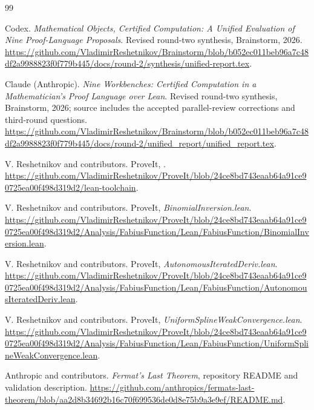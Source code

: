 \documentclass[11pt,letterpaper]{article}
\theoremstyle{definition}\newtheorem{definition}[theorem]{Definition}
\newcommand{\code}[1]{\texttt{\detokenize{#1}}}
\begin{document}
\begin{thebibliography}{99}
\small\raggedright
{}
Codex. \emph{Mathematical Objects, Certified Computation: A Unified Evaluation of Nine Proof-Language Proposals}. Revised round-two synthesis, Brainstorm, 2026.\newline
\url{https://github.com/VladimirReshetnikov/Brainstorm/blob/b052ec011beb96a7c48df2a9988823f0f779b445/docs/round-2/synthesis/unified-report.tex}.

Claude (Anthropic). \emph{Nine Workbenches: Certified Computation in a Mathematician's Proof Language over Lean}. Revised round-two synthesis, Brainstorm, 2026; source includes the accepted parallel-review corrections and third-round questions.\newline
\url{https://github.com/VladimirReshetnikov/Brainstorm/blob/b052ec011beb96a7c48df2a9988823f0f779b445/docs/round-2/unified_report/unified_report.tex}.

V. Reshetnikov and contributors. ProveIt, \code{lean-toolchain}.\newline
\url{https://github.com/VladimirReshetnikov/ProveIt/blob/24ce8bd743eaab64a91ce90725ea00f498d319d2/lean-toolchain}.

V. Reshetnikov and contributors. ProveIt, \emph{BinomialInversion.lean}.\newline
\url{https://github.com/VladimirReshetnikov/ProveIt/blob/24ce8bd743eaab64a91ce90725ea00f498d319d2/Analysis/FabiusFunction/Lean/FabiusFunction/BinomialInversion.lean}.

V. Reshetnikov and contributors. ProveIt, \emph{AutonomousIteratedDeriv.lean}.\newline
\url{https://github.com/VladimirReshetnikov/ProveIt/blob/24ce8bd743eaab64a91ce90725ea00f498d319d2/Analysis/FabiusFunction/Lean/FabiusFunction/AutonomousIteratedDeriv.lean}.

V. Reshetnikov and contributors. ProveIt, \emph{UniformSplineWeakConvergence.lean}.\newline
\url{https://github.com/VladimirReshetnikov/ProveIt/blob/24ce8bd743eaab64a91ce90725ea00f498d319d2/Analysis/FabiusFunction/Lean/FabiusFunction/UniformSplineWeakConvergence.lean}.

Anthropic and contributors. \emph{Fermat's Last Theorem}, repository README and validation description.\newline
\url{https://github.com/anthropics/fermats-last-theorem/blob/aa2d8b34692b16c70f699536de0d8e75b9a3e9ef/README.md}.


\end{thebibliography}
\end{document}
